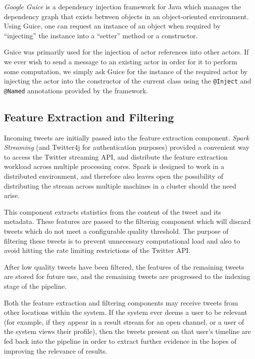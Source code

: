 \documentclass{l4proj}
\newcommand{\code}[1]{\texttt{#1}}
\begin{document}
        \textit{Google Guice} is a dependency injection framework for Java which manages the dependency graph that exists between objects in an object-oriented environment. Using Guice, one can request an instance of an object when required by ``injecting'' the instance into a ``setter'' method or a constructor.

Guice was primarily used for the injection of actor references into other actors. If we ever wish to send a message to an existing actor in order for it to perform some computation, we simply ask Guice for the instance of the required actor by injecting the actor into the constructor of the current class using the \code{@Inject} and \code{@Named} annotations provided by the framework.

        
        \subsection{Feature Extraction and Filtering}
        Incoming tweets are initially passed into the feature extraction component. \textit{Spark Streaming} (and Twitter4j for authentication purposes) provided a convenient way to access the Twitter streaming API, and distribute the feature extraction workload across multiple processing cores. Spark is designed to work in a distributed environment, and therefore also leaves open the possibility of distributing the stream across multiple machines in a cluster should the need arise.
        
        This component extracts statistics from the content of the tweet and its metadata. These features are passed to the filtering component which will discard tweets which do not meet a configurable quality threshold. The purpose of filtering these tweets is to prevent unnecessary computational load and also to avoid hitting the rate limiting restrictions of the Twitter API.
        
        After low quality tweets have been filtered, the features of the remaining tweets are stored for future use, and the remaining tweets are progressed to the indexing stage of the pipeline.

Both the feature extraction and filtering components may receive tweets from other locations within the system. If the system ever deems a user to be relevant (for example, if they appear in a result stream for an open channel, or a user of the system views their profile), then the tweets present on that user’s timeline are fed back into the pipeline in order to extract further evidence in the hopes of improving the relevance of results.
\end{document}
